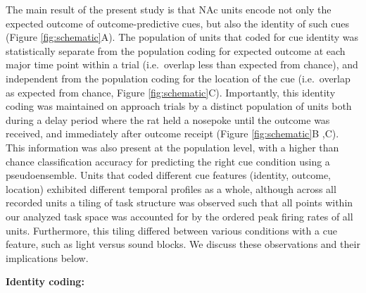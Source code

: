 \documentclass[11pt]{article}
\providecommand{\DIFadd}[1]{{\protect\color{red} \sf #1}} %
\providecommand{\DIFdel}[1]{} %
\providecommand{\DIFaddbegin}{} %
\providecommand{\DIFaddend}{} %
\providecommand{\DIFdelbegin}{} %
\providecommand{\DIFdelend}{} %
\newcommand{\DIFscaledelfig}{0.5}
\newlength{\DIFdelgraphicswidth} %
\newlength{\DIFdelgraphicsheight} %
\newcommand{\DIFaddincludegraphics}[2][]{{\color{red}\fbox{\DIFOincludegraphics[#1]{#2}}}} %
\newcommand{\DIFdelincludegraphics}[2][]{%
\sbox{\DIFdelgraphicsbox}{\DIFOincludegraphics[#1]{#2}}%
\settoboxwidth{\DIFdelgraphicswidth}{\DIFdelgraphicsbox} %
\settoboxtotalheight{\DIFdelgraphicsheight}{\DIFdelgraphicsbox} %
\scalebox{\DIFscaledelfig}{%
\parbox[b]{\DIFdelgraphicswidth}{\usebox{\DIFdelgraphicsbox}\\[-\baselineskip] \rule{\DIFdelgraphicswidth}{0em}}\llap{\resizebox{\DIFdelgraphicswidth}{\DIFdelgraphicsheight}{%
\setlength{\unitlength}{\DIFdelgraphicswidth}%
\begin{picture}(1,1)%
\thicklines\linethickness{2pt} %
{\color[rgb]{1,0,0}\put(0,0){\framebox(1,1){}}}%
{\color[rgb]{1,0,0}\put(0,0){\line( 1,1){1}}}%
{\color[rgb]{1,0,0}\put(0,1){\line(1,-1){1}}}%
\end{picture}%
}\hspace*{3pt}}} %
} %
\DeclareRobustCommand{\DIFaddbegin}{\DIFOaddbegin \let\includegraphics\DIFaddincludegraphics} %
\DeclareRobustCommand{\DIFaddend}{\DIFOaddend \let\includegraphics\DIFOincludegraphics} %
\DeclareRobustCommand{\DIFdelbegin}{\DIFOdelbegin \let\includegraphics\DIFdelincludegraphics} %
\DeclareRobustCommand{\DIFdelend}{\DIFOaddend \let\includegraphics\DIFOincludegraphics} %
\begin{document}
The main result of the present study is that NAc units encode not only the expected outcome of outcome-predictive cues, but also the identity of such cues \DIFdelbegin \DIFdel{. }\DIFdelend \DIFaddbegin \DIFadd{(Figure \ref{fig:schematic}A). The population of units that coded for cue identity was statistically separate from the population coding for expected outcome at each major time point within a trial (i.e.\ overlap less than expected from chance), and independent from the population coding for the location of the cue (i.e.\ overlap as expected from chance, Figure \ref{fig:schematic}C). }\DIFaddend Importantly, this identity coding was maintained on approach trials \DIFaddbegin \DIFadd{by a distinct population of units }\DIFaddend both during a delay period where the rat held a nosepoke until the outcome was received, \DIFdelbegin \DIFdel{after }\DIFdelend \DIFaddbegin \DIFadd{and }\DIFaddend immediately after outcome receipt (\DIFdelbegin \DIFdel{H2 and H3 in }\DIFdelend Figure \ref{fig:schematic}B\DIFdelbegin \DIFdel{)}\DIFdelend \DIFaddbegin \DIFadd{,C). This information was also present at the population level, with a higher than chance classification accuracy for predicting the right cue condition using a pseudoensemble}\DIFaddend . \DIFdelbegin \DIFdel{Units coding for cue identity showed partial
overlap with those coding for expected outcome (H3 in Figure
\ref{fig:schematic}A). }\DIFdelend Units that coded different cue features (identity, outcome, location) exhibited different temporal profiles as a whole, although across all recorded units a tiling of task structure was observed such that all points within our analyzed task space was accounted for by the ordered peak firing rates of all units. Furthermore, this tiling differed between various conditions with a cue feature, such as light versus sound blocks. We discuss these observations and their implications below.

{\bf \DIFdelbegin \DIFdel{Cue identity}\DIFdelend \DIFaddbegin \DIFadd{Identity coding}\DIFaddend :}
\end{document}
